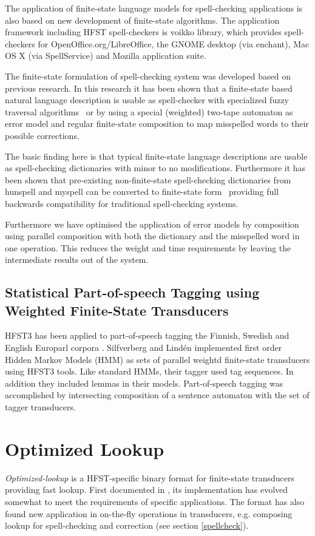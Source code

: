 \documentclass{llncs}
\begin{document}
The application of finite-state language models for spell-checking applications
is also based on new development of finite-state algorithms. The application
framework including HFST spell-checkers is voikko library, which provides
spell-checkers for OpenOffice.org/LibreOffice, the GNOME desktop (via
enchant), Mac OS X (via SpellService) and Mozilla application suite.

The finite-state formulation of spell-checking system was developed based on
previous research. In this research it has been shown that a finite-state based
natural language description is usable as spell-checker with specialized fuzzy
traversal algorithms~\cite{oflazer/1996,hulden/2009} or by using a special
(weighted) two-tape automaton as error model and regular finite-state
composition to map misspelled words to their possible
corrections\cite{agata/2002,pirinen/2010/lrec}.
 
The basic finding here is that typical finite-state language descriptions are
usable as spell-checking dictionaries with minor to no modifications.
Furthermore it has been shown that pre-existing non-finite-state spell-checking
dictionaries from hunspell and myspell can be converted to finite-state
form~\cite{pirinen/2010/cla} providing full backwards compatibility for
traditional spell-checking systems.

Furthermore we have optimised the application of error models by composition
using parallel composition with both the dictionary and the misspelled word in
one operation. This reduces the weight and time requirements by leaving the
intermediate results out of the system.

\subsection{Statistical Part-of-speech Tagging using Weighted Finite-State Transducers}

HFST3 has been applied to part-of-speech tagging the Finnish, Swedish
and English Europarl corpora \cite{silfverberg/2010}. Silfverberg and
Lind\'{e}n implemented first order Hidden Markov Models (HMM) as sets
of parallel weightd finite-state transducers using HFST3 tools. Like
standard HMMs, their tagger used tag sequences. In addition they
included lemmas in their models. Part-of-speech tagging was
accomplished by intersecting composition of a sentence automaton with
the set of tagger transducers.

\section{Optimized Lookup}\label{optimized-lookup}
\emph{Optimized-lookup} is a HFST-specific binary format for finite-state
transducers providing fast lookup. First documented in \cite{silfverberg/2009},
its implementation has evolved somewhat to meet the requirements of specific
applications. The format has also found new application in on-the-fly
operations in transducers, e.g. composing lookup for spell-checking and
correction (see section \ref{spellcheck}).
\end{document}

